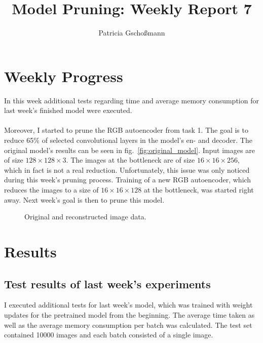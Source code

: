 \documentclass[10pt,twocolumn,letterpaper]{article}
\begin{document}
\title{Model Pruning: Weekly Report 7}
\author{Patricia Gschoßmann}

\maketitle

\section{Weekly Progress}
In this week additional tests regarding time and average memory consumption for last week's finished model were executed.\\\\
Moreover, I started to prune the RGB autoencoder from task 1.
The goal is to reduce 65\% of selected convolutional layers in the model's en- and decoder.
The original model's results can be seen in fig.~\ref{fig:original_model}.
Input images are of size $128\times128\times3$.
The images at the bottleneck are of size $16\times16\times256$, which in fact is not a real reduction.
Unfortunately, this issue was only noticed during this week's pruning process.
Training of a new RGB autoencoder, which reduces the images to a size of $16\times16\times128$ at the bottleneck, was started right away.
Next week's goal is then to prune this model.
\begin{figure}[hpbt]
	\centering
	\qquad
	\caption[]{Original and reconstructed image data.}
	\label{fig:results}
\end{figure}

\section{Results}
\subsection{Test results of last week's experiments}
I executed additional tests for last week's model, which was trained with weight updates for the pretrained model from the beginning.
The average time taken as well as the average memory consumption per batch was calculated.
The test set contained 10000 images and each batch consisted of a single image.
\end{document}

